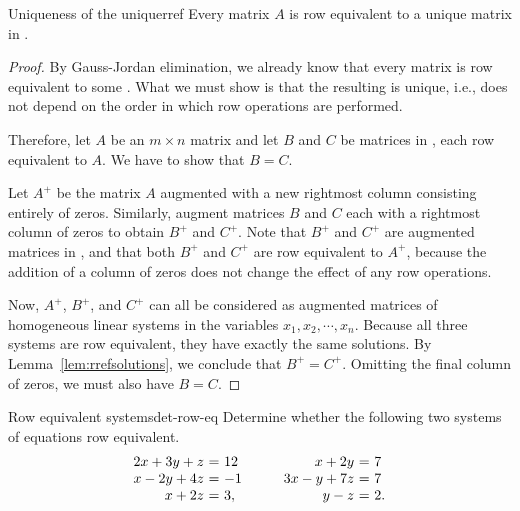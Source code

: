 \begin{theorem}{Uniqueness of the {\rref}}{uniquerref}
  Every matrix $A$ is row equivalent to a unique matrix in {\rref}.
\end{theorem}

\begin{proof}
  By Gauss-Jordan elimination, we already know that every matrix is
  row equivalent to some {\rref}. What we must show is that the
  resulting {\rref} is unique, i.e., does not depend on the order in
  which row operations are performed.
  
  Therefore, let $A$ be an $m \times n$ matrix and let $B$ and $C$ be
  matrices in {\rref}, each row equivalent to $A$. We have to show
  that $B=C$.

  Let $A^{+}$ be the matrix $A$ augmented with a new rightmost column
  consisting entirely of zeros. Similarly, augment matrices $B$ and
  $C$ each with a rightmost column of zeros to obtain $B^{+}$ and
  $C^{+}$. Note that $B^{+}$ and $C^{+}$ are augmented matrices in
  {\rref}, and that both $B^{+}$ and $C^{+}$ are row equivalent to
  $A^{+}$, because the addition of a column of zeros does not change
  the effect of any row operations.

  Now, $A^{+}$, $B^{+}$, and $C^{+}$ can all be considered as
  augmented matrices of homogeneous linear systems in the variables
  $x_1, x_2, \cdots, x_n$. Because all three systems are row
  equivalent, they have exactly the same solutions. By
  Lemma~\ref{lem:rrefsolutions}, we conclude that $B^{+}=C^{+}$.
  Omitting the final column of zeros, we must also have $B=C$.
\end{proof}

\begin{example}{Row equivalent systems}{det-row-eq}
  Determine whether the following two systems of equations row equivalent.
  \begin{equation*}
    \begin{array}{r@{~}c@{~}l}
      2x + 3y + z &=& 12 \\
      x - 2y + 4z &=& -1 \\
      x + 2z &=& 3,
    \end{array}
    \quad\quad
    \begin{array}{r@{~}c@{~}l}
      x + 2y &=& 7 \\
      3x - y + 7z &=& 7 \\
      y - z &=& 2.
    \end{array}
  \end{equation*}
\end{example}

